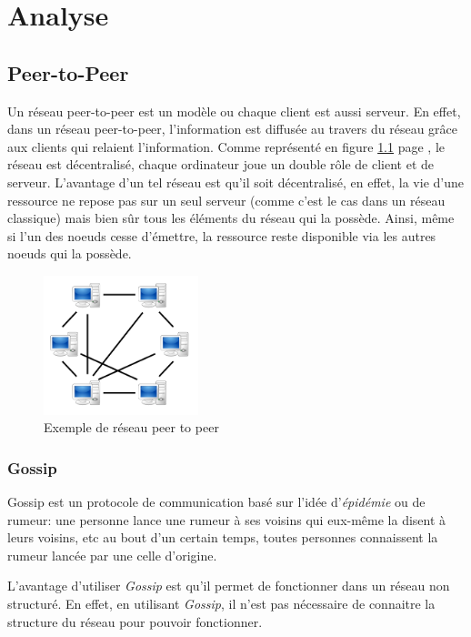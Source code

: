 \chapter{Analyse}


\section{Peer-to-Peer}

	Un réseau peer-to-peer est un modèle ou chaque client est aussi serveur. En effet, dans un réseau peer-to-peer, l'information est diffusée au travers du réseau grâce aux clients qui relaient l'information. Comme représenté en figure \ref{fig:p2p} page \pageref{fig:p2p}, le réseau est décentralisé, chaque ordinateur joue un double rôle de client et de serveur. L'avantage d'un tel réseau est qu'il soit décentralisé, en effet, la vie d'une ressource ne repose pas sur un seul serveur (comme c'est le cas dans un réseau classique) mais bien sûr tous les éléments du réseau qui la possède. Ainsi, même si l'un des noeuds cesse d'émettre, la ressource reste disponible via les autres noeuds qui la possède.
	
	\begin{figure}
	  \center
      \includegraphics[width=0.4\textwidth]{includes/P2P-network.png}
      \caption{Exemple de réseau peer to peer}
      \label{fig:p2p}
    \end{figure}
	
	\subsection{Gossip}
	
		Gossip est un protocole de communication basé sur l'idée d'\emph{épidémie} ou de rumeur: une personne lance une rumeur à ses voisins qui eux-même la disent à leurs voisins, etc au bout d'un certain temps, toutes personnes connaissent la rumeur lancée par une celle d'origine.
		
		L'avantage d'utiliser \emph{Gossip} est qu'il permet de fonctionner dans un réseau non structuré. En effet, en utilisant \emph{Gossip}, il n'est pas nécessaire de connaitre la structure du réseau pour pouvoir fonctionner.
		

